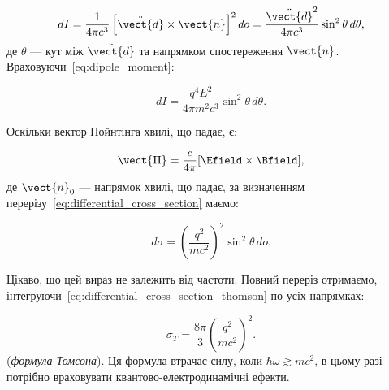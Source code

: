 \begin{equation}
dI =\frac1{4\pi c^3}\left[\ddot{\vect{d}}\times\vect{n}\right]^2do = \frac{\ddot{\vect{d}}^2}{4\pi c^3}  \sin^2 \theta \, d\theta,
\label{eq:intensity_dipole}
\end{equation}
де \( \theta \) --- кут між \( \ddot{\vect{d}} \) та напрямком спостереження \( \vect{n} \).
Враховуючи~\eqref{eq:dipole_moment}:

\begin{equation*}
dI = \frac{q^4 E^2}{4\pi m^2 c^3} \sin^2 \theta \, d\theta.
\end{equation*}

Оскільки вектор Пойнтінга хвилі, що падає, є:

\begin{equation*}
\vect{\Pi} = \frac{c}{4\pi} [\Efield \times \Bfield],
\end{equation*}
де \( \vect{n}_0 \) --- напрямок хвилі, що падає, за визначенням перерізу~\eqref{eq:differential_cross_section} маємо:

\begin{equation}
d\sigma = \left( \frac{q^2}{mc^2} \right)^2 \sin^2 \theta \, do.
\label{eq:differential_cross_section_thomson}
\end{equation}

Цікаво, що цей вираз не залежить від частоти. Повний переріз отримаємо,
інтегруючи~\eqref{eq:differential_cross_section_thomson} по усіх напрямках:

\begin{equation}
\sigma_T = \frac{8\pi}{3} \left( \frac{q^2}{mc^2} \right)^2.
\label{eq:thomson_cross_section}
\end{equation}
(\emph{формула Томсона}). Ця формула втрачає силу, коли \( \hbar \omega \gtrsim mc^2 \), в цьому разі потрібно
враховувати квантово-електродинамічні ефекти.


